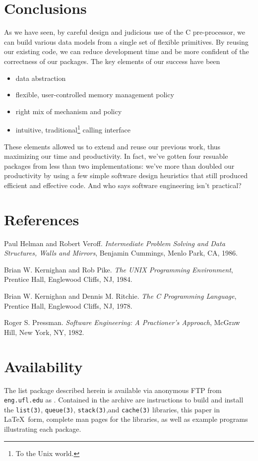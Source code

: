 \section{Conclusions}
As we have seen, by careful design and judicious use of the C pre-processor,
we can build various data models from a single set of flexible primitives.  By
reusing our existing code, we can reduce development time and be more
confident of the correctness of our packages.  The key elements of our success
have been
\begin{itemize}
	\item data abstraction
	\item flexible, user-controlled memory management policy
	\item right mix of mechanism and policy
	\item intuitive, traditional\footnote{To the Unix world.} calling
	      interface
\end{itemize}

These elements allowed us to extend and reuse our previous work, thus
maximizing our time and productivity.  In fact, we've gotten four resuable
packages from less than two implementations: we've more than doubled our
productivity by using a few simple software design heuristics that still
produced efficient and effective code.  And who says software engineering
isn't practical?

\newpage
\appendix
{}
\section{References}
\begin{list}{[]}{}
\item
	Paul Helman and Robert Veroff.
	{\em Intermediate Problem Solving and Data Structures, Walls
		and Mirrors},
	Benjamin Cummings, Menlo Park, CA,
	1986.
\item
	Brian W. Kernighan and Rob Pike.
	{\em The UNIX Programming Environment},
	Prentice Hall, Englewood Cliffs, NJ,
	1984. 
\item
	Brian W. Kernighan and Dennis M. Ritchie.
	{\em The C Programming Language},
	Prentice Hall, Englewood Cliffs, NJ,
	1978.
\item
	Roger S. Pressman.
	{\em Software Engineering: A Practioner's Approach},
	McGraw Hill, New York, NY,
	1982.
\end{list}

\section{Availability}
The list package described herein is available via anonymous FTP from {\tt
eng.ufl.edu} as .  Contained in the archive are
instructions to build and install the {\tt list(3)}, {\tt queue(3)},
{\tt stack(3)},and {\tt cache(3)} libraries, this paper in \LaTeX \ form,
complete man pages for the libraries, as well as example programs illustrating
each package.


